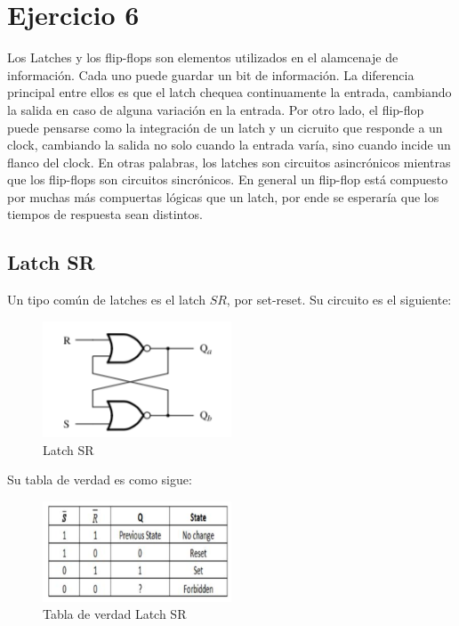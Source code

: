 \section{Ejercicio 6}


Los Latches y los flip-flops son elementos utilizados en el alamcenaje de información. Cada uno puede guardar un bit de información. La diferencia principal entre ellos es que el latch chequea continuamente la entrada, cambiando la salida en caso de alguna variaci\'on en la entrada. Por otro lado, el flip-flop puede pensarse como la integración de un latch y un cicruito que responde a un clock, cambiando la salida no solo cuando la entrada varía, sino cuando incide un flanco del clock. En otras palabras, los latches son circuitos asincrónicos mientras que los flip-flops son circuitos sincrónicos. En general un flip-flop está compuesto por muchas más compuertas lógicas que un latch, por ende se esperaría que los tiempos de respuesta sean distintos. 



\subsection{Latch SR}

Un tipo común de latches es el latch $SR$, por set-reset. Su circuito es el siguiente:

\begin{figure}[H]
	\centering
	\includegraphics[width=0.5\textwidth]{Ejercicio6/Recursos/latchSR}
	\caption{Latch SR}
\end{figure}

Su tabla de verdad es como sigue:

\begin{figure}[H]
	\centering
	\includegraphics[width=0.5\textwidth]{Ejercicio6/Recursos/tablalatch}
	\caption{Tabla de verdad Latch SR}
\end{figure}


